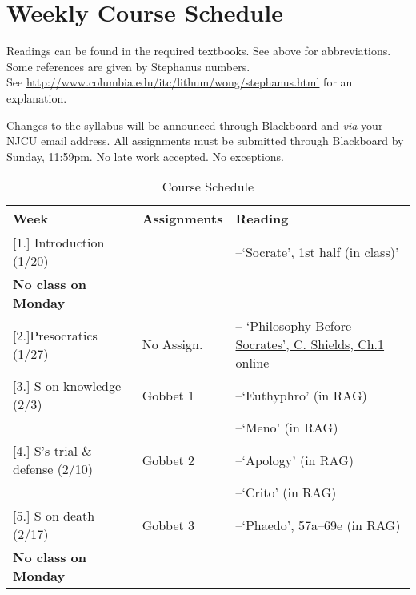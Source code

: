 \documentclass[article,oneside]{memoir}
\begin{document}
\section{Weekly Course Schedule}
Readings can be found in the required textbooks. See above for abbreviations. Some references are given by Stephanus numbers.\\ See \href{http://www.columbia.edu/itc/lithum/wong/stephanus.html}{http://www.columbia.edu/itc/lithum/wong/stephanus.html} for an explanation. 

 Changes to the syllabus will be announced through Blackboard and \emph{via} your NJCU email address.  All assignments must be submitted through Blackboard by Sunday, 11:59pm. No late work accepted. No exceptions.   \newline

\begin{center}
\begin{longtable}{p{4.5cm}p{2cm}p{6.5cm}}
 
  \caption{Course Schedule} \\
  \toprule
  \textbf{Week} &\textbf{Assignments} & \textbf{Reading} \\
  \midrule

  

[1.] Introduction (1/20)	&  		& --`Socrate', 1st half (in class)' \\ 
\textbf{No class on Monday}		&		  &    \\ [1.8\baselineskip]

[2.]Presocratics (1/27)	  	& No Assign.			& -- \href{https://scottoconnor.org/ancient/Shields2.pdf}{`Philosophy Before Socrates', C. Shields, Ch.1} online  \\ [1.8\baselineskip]

[3.] S on knowledge (2/3)			& Gobbet 1		& --`Euthyphro'  (in RAG) \\
			        				&			  	&  --`Meno' (in RAG) \\ [1.8\baselineskip] %

[4.] S's trial \& defense (2/10)		& Gobbet 2		& --`Apology' (in RAG) \\
			     				& 			         & --`Crito' (in RAG)  \\ [1.8\baselineskip]  

[5.] S on death  (2/17)			& Gobbet 3	    	 & --`Phaedo', 57a--69e (in RAG) \\
\textbf{No class on Monday}						 & 			      & \\ [1.8\baselineskip] %


\end{longtable}
\end{center}
\end{document}
